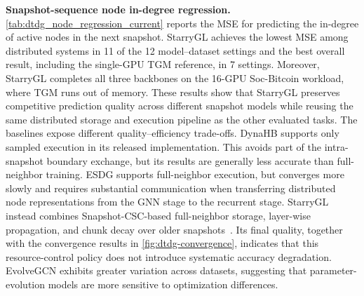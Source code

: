 \noindent\textbf{Snapshot-sequence node in-degree regression.}
\autoref{tab:dtdg_node_regression_current} reports the MSE for
predicting the in-degree of active nodes in the next snapshot.
StarryGL achieves the lowest MSE among distributed systems in
11 of the 12 model--dataset settings and the best overall
result, including the single-GPU TGM reference, in 7 settings.
Moreover, StarryGL completes all three backbones on the 16-GPU
Soc-Bitcoin workload, where TGM runs out of memory. These results show
that StarryGL preserves competitive prediction quality across different
snapshot models while reusing the same distributed storage and
execution pipeline as the other evaluated tasks.
The baselines expose different quality--efficiency trade-offs. DynaHB
supports only sampled execution in its released implementation. This
avoids part of the intra-snapshot boundary exchange, but its results
are generally less accurate than full-neighbor training. ESDG supports
full-neighbor execution, but converges more slowly and requires
substantial communication when transferring distributed node
representations from the GNN stage to the recurrent stage. StarryGL instead combines Snapshot-CSC-based
full-neighbor storage, layer-wise propagation, and chunk decay over
older snapshots~\cite{huangflaredtdg}. Its final quality, together
with the convergence results in \autoref{fig:dtdg-convergence}, indicates
that this resource-control policy does not introduce systematic
accuracy degradation. EvolveGCN exhibits greater variation across
datasets, suggesting that parameter-evolution models are more
sensitive to optimization differences.
